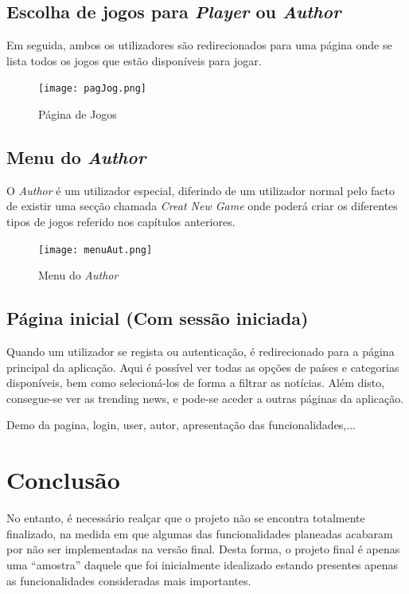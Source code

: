 \documentclass[11pt,a4paper]{report}
\begin{document}
\section{Escolha de jogos para \emph{Player} ou \emph{Author}}
Em seguida, ambos os utilizadores são redirecionados para uma página onde se lista todos os jogos que estão disponíveis para jogar.

\begin{figure}[h]
    \centering
    \texttt{[image: pagJog.png]}
    \caption{Página de Jogos}
    \label{fig:pagJog}
\end{figure}

\section{Menu do \emph{Author}}
O \emph{Author} é um utilizador especial, diferindo de um utilizador normal pelo facto de existir uma secção chamada \emph{Creat New Game} onde poderá criar os diferentes tipos de jogos referido nos capítulos anteriores.

\begin{figure}[h]
    \centering
    \texttt{[image: menuAut.png]}
    \caption{Menu do \emph{Author}}
    \label{fig:menuAut}
\end{figure}

\section{Página inicial (Com sessão iniciada)}

Quando um utilizador se regista ou autenticação, é redirecionado para a página principal da aplicação. Aqui é possível ver todas as opções de países e categorias disponíveis, bem como selecioná-los de forma a filtrar as notícias. Além disto, consegue-se ver as trending news, e pode-se aceder a outras páginas da aplicação.

Demo da pagina, login, user, autor, apresentação das funcionalidades,...

\chapter{Conclusão}

No entanto, é necessário realçar que o projeto não se encontra totalmente finalizado, na medida em que algumas das funcionalidades planeadas acabaram por não ser implementadas na versão final. Desta forma, o projeto final é apenas uma “amostra” daquele que foi inicialmente idealizado estando presentes apenas as funcionalidades consideradas mais importantes.
\end{document}
